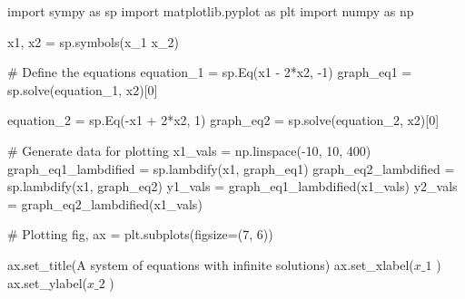 \documentclass[
  letterpaper,
  DIV=11,
  numbers=noendperiod]{scrreprt}
\newenvironment{Shaded}{\begin{snugshade}}{\end{snugshade}}
\newcommand{\CommentTok}[1]{\textcolor[rgb]{0.37,0.37,0.37}{#1}}
\newcommand{\DecValTok}[1]{\textcolor[rgb]{0.68,0.00,0.00}{#1}}
\newcommand{\ImportTok}[1]{\textcolor[rgb]{0.00,0.46,0.62}{#1}}
\newcommand{\NormalTok}[1]{\textcolor[rgb]{0.00,0.23,0.31}{#1}}
\newcommand{\OperatorTok}[1]{\textcolor[rgb]{0.37,0.37,0.37}{#1}}
\newcommand{\StringTok}[1]{\textcolor[rgb]{0.13,0.47,0.30}{#1}}
\begin{document}
\begin{Shaded}
\begin{Highlighting}[]
\ImportTok{import}\NormalTok{ sympy }\ImportTok{as}\NormalTok{ sp}
\ImportTok{import}\NormalTok{ matplotlib.pyplot }\ImportTok{as}\NormalTok{ plt}
\ImportTok{import}\NormalTok{ numpy }\ImportTok{as}\NormalTok{ np}

\NormalTok{x1, x2 }\OperatorTok{=}\NormalTok{ sp.symbols(}\StringTok{\textquotesingle{}x\_1 x\_2\textquotesingle{}}\NormalTok{)}

\CommentTok{\# Define the equations}
\NormalTok{equation\_1 }\OperatorTok{=}\NormalTok{ sp.Eq(x1 }\OperatorTok{{-}} \DecValTok{2}\OperatorTok{*}\NormalTok{x2, }\OperatorTok{{-}}\DecValTok{1}\NormalTok{)}
\NormalTok{graph\_eq1 }\OperatorTok{=}\NormalTok{ sp.solve(equation\_1, x2)[}\DecValTok{0}\NormalTok{]}

\NormalTok{equation\_2 }\OperatorTok{=}\NormalTok{ sp.Eq(}\OperatorTok{{-}}\NormalTok{x1 }\OperatorTok{+} \DecValTok{2}\OperatorTok{*}\NormalTok{x2, }\DecValTok{1}\NormalTok{)}
\NormalTok{graph\_eq2 }\OperatorTok{=}\NormalTok{ sp.solve(equation\_2, x2)[}\DecValTok{0}\NormalTok{]}

\CommentTok{\# Generate data for plotting}
\NormalTok{x1\_vals }\OperatorTok{=}\NormalTok{ np.linspace(}\OperatorTok{{-}}\DecValTok{10}\NormalTok{, }\DecValTok{10}\NormalTok{, }\DecValTok{400}\NormalTok{)}
\NormalTok{graph\_eq1\_lambdified }\OperatorTok{=}\NormalTok{ sp.lambdify(x1, graph\_eq1)}
\NormalTok{graph\_eq2\_lambdified }\OperatorTok{=}\NormalTok{ sp.lambdify(x1, graph\_eq2)}
\NormalTok{y1\_vals }\OperatorTok{=}\NormalTok{ graph\_eq1\_lambdified(x1\_vals)}
\NormalTok{y2\_vals }\OperatorTok{=}\NormalTok{ graph\_eq2\_lambdified(x1\_vals)}

\CommentTok{\# Plotting}
\NormalTok{fig, ax }\OperatorTok{=}\NormalTok{ plt.subplots(figsize}\OperatorTok{=}\NormalTok{(}\DecValTok{7}\NormalTok{, }\DecValTok{6}\NormalTok{))}

\NormalTok{ax.set\_title(}\StringTok{\textquotesingle{}A system of equations with infinite solutions\textquotesingle{}}\NormalTok{)}
\NormalTok{ax.set\_xlabel(}\StringTok{\textquotesingle{}$x\_1$                                                                                                                            \textquotesingle{}}\NormalTok{)}
\NormalTok{ax.set\_ylabel(}\StringTok{\textquotesingle{}$x\_2$                                                                                                    \textquotesingle{}}\NormalTok{)}


\end{Highlighting}
\end{Shaded}
\end{document}
